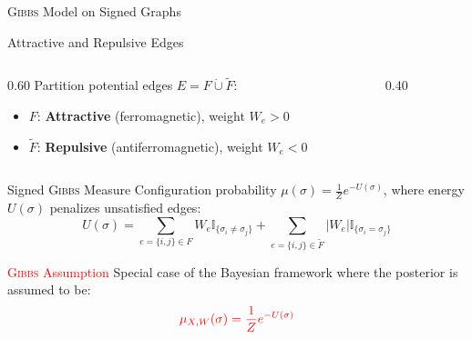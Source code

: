 \documentclass[A4,svgnames,9pt,aspectratio=169]{beamer}
\newcommand{\ind}[1]{\mathbb{I}_{\{#1\}}}
\begin{document}
\begin{frame}{\textsc{Gibbs} Model on Signed Graphs}
  \begin{block}{Attractive and Repulsive Edges}
    \begin{columns}[c]
      \begin{column}{0.60\textwidth}
        Partition potential edges $E = F \dot{\cup} \tilde{F}$:
        \begin{itemize}
          \item $F$: \textbf{Attractive} (ferromagnetic), weight $W_e > 0$
          \item $\tilde{F}$: \textbf{Repulsive} (antiferromagnetic), weight $W_e < 0$
        \end{itemize}
      \end{column}
      \begin{column}{0.40\textwidth}
        \centering
      \end{column}
    \end{columns}
  \end{block}
  \begin{block}{Signed \textsc{Gibbs} Measure \cite{Reichardt2006}}
    Configuration probability $\mu(\sigma) = \frac{1}{Z} e^{-U(\sigma)}$, where energy $U(\sigma)$ penalizes unsatisfied edges:
    \begin{equation*}
        U(\sigma) = \sum_{e=\{i,j\} \in F} W_e \ind{\sigma_i \neq \sigma_j} + \sum_{e=\{i,j\} \in \tilde{F}} |W_e| \ind{\sigma_i = \sigma_j}
    \end{equation*}
  \end{block}
  \begin{block}{\textcolor{red}{\textsc{Gibbs} Assumption}}
    Special case of the Bayesian framework where the posterior is assumed to be:
    \begin{equation*}
        \textcolor{red}{\mu_{X,W}(\sigma) = \frac{1}{Z} e^{-U(\sigma)}}
    \end{equation*}
  \end{block}
\end{frame}
\end{document}
